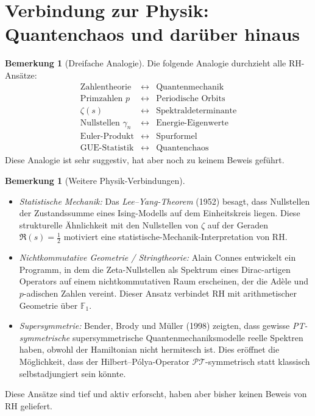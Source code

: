 \documentclass[12pt,a4paper]{amsart}
\theoremstyle{definition}
\newtheorem{remark}[theorem]{Bemerkung}
\begin{document}
\section{Verbindung zur Physik: Quantenchaos und dar\"uber hinaus}

\begin{remark}[Dreifache Analogie]
Die folgende Analogie durchzieht alle RH-Ans\"atze:
\[
\begin{array}{ccc}
  \text{Zahlentheorie} & \longleftrightarrow & \text{Quantenmechanik} \\
  \hline
  \text{Primzahlen } p & \longleftrightarrow & \text{Periodische Orbits} \\
  \zeta(s) & \longleftrightarrow & \text{Spektraldeterminante} \\
  \text{Nullstellen } \gamma_n & \longleftrightarrow & \text{Energie-Eigenwerte} \\
  \text{Euler-Produkt} & \longleftrightarrow & \text{Spurformel} \\
  \text{GUE-Statistik} & \longleftrightarrow & \text{Quantenchaos}
\end{array}
\]
Diese Analogie ist sehr suggestiv, hat aber noch zu keinem Beweis gef\"uhrt.
\end{remark}

\begin{remark}[Weitere Physik-Verbindungen]
\begin{itemize}
  \item \textit{Statistische Mechanik:} Das \emph{Lee--Yang-Theorem} (1952)
    besagt, dass Nullstellen der Zustandssumme eines Ising-Modells auf dem
    Einheitskreis liegen.  Diese strukturelle \"Ahnlichkeit mit den Nullstellen
    von $\zeta$ auf der Geraden $\Re(s) = \tfrac{1}{2}$ motiviert eine
    statistische-Mechanik-Interpretation von RH.
  \item \textit{Nichtkommutative Geometrie / Stringtheorie:} Alain Connes
    \cite{Connes1999} entwickelt ein Programm, in dem die Zeta-Nullstellen
    als Spektrum eines Dirac-artigen Operators auf einem nichtkommutativen
    Raum erscheinen, der die Ad\`ele und $p$-adischen Zahlen vereint.
    Dieser Ansatz verbindet RH mit arithmetischer Geometrie \"uber $\mathbb{F}_1$.
  \item \textit{Supersymmetrie:} Bender, Brody und M\"uller (1998) zeigten,
    dass gewisse \emph{PT-symmetrische} supersymmetrische Quantenmechaniksmodelle
    reelle Spektren haben, obwohl der Hamiltonian nicht hermitesch ist.
    Dies er\"offnet die M\"oglichkeit, dass der Hilbert--P\'olya-Operator
    $\mathcal{P}\mathcal{T}$-symmetrisch statt klassisch selbstadjungiert sein k\"onnte.
\end{itemize}
Diese Ans\"atze sind tief und aktiv erforscht, haben aber bisher keinen
Beweis von RH geliefert.
\end{remark}
\end{document}
